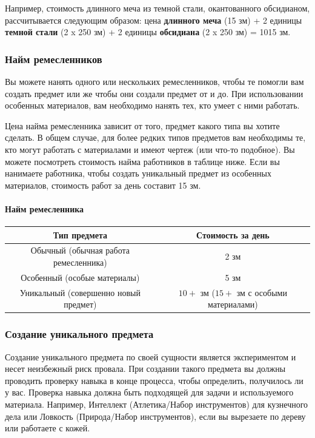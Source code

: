 \documentclass[a4paper, 9pt, twocolumn]{book}
\begin{document}
	Например, стоимость длинного меча из темной стали, окантованного обсидианом, рассчитывается следующим образом: цена \textbf{длинного меча} (15 зм) + 2 единицы \textbf{темной стали} (2 x 250 зм) + 2 единицы \textbf{обсидиана} (2 x 250 зм) = 1015 зм.
	
	\subsubsection{Найм ремесленников}
	
	Вы можете нанять одного или нескольких ремесленников, чтобы те помогли вам создать предмет или же чтобы они создали предмет от и до. При использовании особенных материалов, вам необходимо нанять тех, кто умеет с ними работать.
	
	Цена найма ремесленника зависит от того, предмет какого типа вы хотите сделать. В общем случае, для более редких типов предметов вам необходимы те, кто могут работать с материалами и имеют чертеж (или что-то подобное). Вы можете посмотреть стоимость найма работников в таблице ниже. Если вы нанимаете работника, чтобы создать уникальный предмет из особенных материалов, стоимость работ за день составит 15 зм.
	
	\paragraph{Найм ремесленника}
	
	\begin{tabular}{|c|c|}
		\hline
		\textbf{Тип предмета} & \textbf{Стоимость за день} \\
		\hline
		Обычный (обычная работа ремесленника) & 2 зм \\
		\hline
		Особенный (особые материалы) & 5 зм \\
		\hline
		Уникальный (совершенно новый предмет) & $10+$ зм ($15+$ зм с особыми материалами) \\
		\hline
	\end{tabular}
	
	\subsubsection{Создание уникального предмета}
	
	Создание уникального предмета по своей сущности является экспериментом и несет неизбежный риск провала. При создании такого предмета вы должны проводить проверку навыка в конце процесса, чтобы определить, получилось ли у вас. Проверка навыка должна быть подходящей для задачи и используемого материала. Например, Интеллект (Атлетика/Набор инструментов) для кузнечного дела или Ловкость (Природа/Набор инструментов), если вы вырезаете по дереву или работаете с кожей.
	
\end{document}

